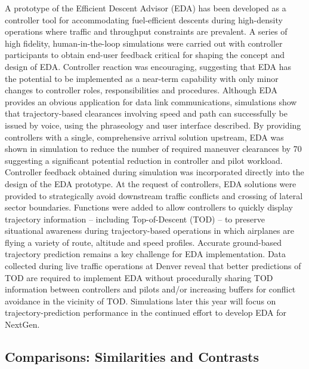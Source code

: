 \documentclass{aer1315-pretty}
\begin{document}
\begin{itemize}
A prototype of the Efficient Descent Advisor
(EDA) has been developed as a controller tool
for accommodating fuel-efficient descents
during high-density operations where traffic and
throughput constraints are prevalent. A series of
high fidelity, human-in-the-loop simulations
were carried out with controller participants to
obtain end-user feedback critical for shaping the
concept and design of EDA.
Controller reaction was encouraging,
suggesting that EDA has the potential to be
implemented as a near-term capability with only
minor changes to controller roles,
responsibilities and procedures. Although EDA
provides an obvious application for data link
communications, simulations show that
trajectory-based clearances involving speed and
path can successfully be issued by voice, using
the phraseology and user interface described. By
providing controllers with a single,
comprehensive arrival solution upstream, EDA was shown in simulation to reduce the number
of required maneuver clearances by 70%
suggesting a significant potential reduction in
controller and pilot workload.
Controller feedback obtained during
simulation was incorporated directly into the
design of the EDA prototype. At the request of
controllers, EDA solutions were provided to
strategically avoid downstream traffic conflicts
and crossing of lateral sector boundaries.
Functions were added to allow controllers to
quickly display trajectory information –
including Top-of-Descent (TOD) – to preserve
situational awareness during trajectory-based
operations in which airplanes are flying a
variety of route, altitude and speed profiles.
Accurate ground-based trajectory
prediction remains a key challenge for EDA
implementation. Data collected during live
traffic operations at Denver reveal that better
predictions of TOD are required to implement
EDA without procedurally sharing TOD
information between controllers and pilots
and/or increasing buffers for conflict avoidance
in the vicinity of TOD. Simulations later this
year will focus on trajectory-prediction
performance in the continued effort to develop
EDA for NextGen.



\end{itemize}

\subsection{Comparisons: Similarities and Contrasts} \label{ssec:comparisons}
\end{document}
